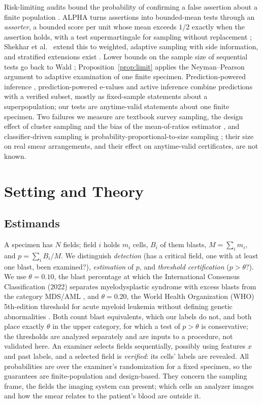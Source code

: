 \documentclass[journal]{IEEEtran}
\begin{document}
Risk-limiting audits bound the probability of confirming a false assertion about a finite population \cite{lindeman2012gentle}. ALPHA \cite{stark2023alpha} turns assertions into bounded-mean tests through an \emph{assorter}, a bounded score per unit whose mean exceeds $1/2$ exactly when the assertion holds, with a test supermartingale for sampling without replacement \cite{waudbysmith2020wor,waudbysmith2024betting,ville1939}; Shekhar et al.\ \cite{shekhar2023rlfa} extend this to weighted, adaptive sampling with side information, and stratified extensions exist \cite{spertus2024stratified}. Lower bounds on the sample size of sequential tests go back to Wald \cite{wald1945}; Proposition~\ref{prop:limit} applies the Neyman--Pearson argument \cite{lehmann2005tsh} to adaptive examination of one finite specimen. Prediction-powered inference \cite{angelopoulos2023ppi}, prediction-powered e-values \cite{csillag2025ppe} and active inference \cite{zrnic2024active} combine predictions with a verified subset, mostly as fixed-sample statements about a superpopulation; our tests are anytime-valid statements about one finite specimen. Two failures we measure are textbook survey sampling, the design effect of cluster sampling \cite{kish1965} and the bias of the mean-of-ratios estimator \cite{cochran1977}, and classifier-driven sampling is probability-proportional-to-size sampling \cite{hansen1943,horvitz1952}; their size on real smear arrangements, and their effect on anytime-valid certificates, are not known.

\section{Setting and Theory}
\subsection{Estimands}
A specimen has $N$ fields; field $i$ holds $m_i$ cells, $B_i$ of them blasts, $M=\sum_i m_i$, and $p=\sum_iB_i/M$. We distinguish \emph{detection} (has a critical field, one with at least one blast, been examined?), \emph{estimation} of $p$, and \emph{threshold certification} ($p>\theta$?). We use $\theta=0.10$, the blast percentage at which the International Consensus Classification (2022) separates myelodysplastic syndrome with excess blasts from the category MDS/AML \cite{arber2022icc}, and $\theta=0.20$, the World Health Organization (WHO) 5th-edition threshold for acute myeloid leukemia without defining genetic abnormalities \cite{khoury2022who}. Both count blast equivalents, which our labels do not, and both place exactly $\theta$ in the upper category, for which a test of $p>\theta$ is conservative; the thresholds are analyzed separately and are inputs to a procedure, not validated here. An examiner selects fields sequentially, possibly using features $x$ and past labels, and a selected field is \emph{verified}: its cells' labels are revealed. All probabilities are over the examiner's randomization for a fixed specimen, so the guarantees are finite-population and design-based. They concern the sampling frame, the fields the imaging system can present; which cells an analyzer images and how the smear relates to the patient's blood are outside it.
\end{document}

